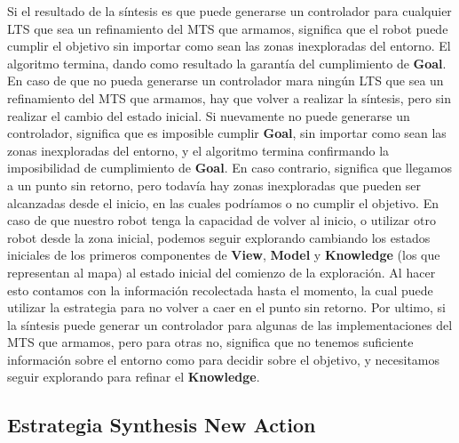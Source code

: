 \vspace{\baselineskip}
Si el resultado de la síntesis es que puede generarse un controlador para cualquier LTS que sea un refinamiento del MTS que armamos, significa que el robot
puede cumplir el objetivo sin importar como sean las zonas inexploradas del entorno. El algoritmo termina, dando como resultado la garantía del cumplimiento
de \textbf{Goal}.
En caso de que no pueda generarse un controlador mara ningún LTS que sea un refinamiento del MTS que armamos, hay que volver a realizar la síntesis, pero sin
realizar el cambio del estado inicial. Si nuevamente no puede generarse un controlador, significa que es imposible cumplir \textbf{Goal}, sin importar como sean
las zonas inexploradas del entorno, y el algoritmo termina confirmando la imposibilidad de cumplimiento de \textbf{Goal}. En caso contrario, significa que
llegamos a un punto sin retorno, pero todavía hay zonas inexploradas que pueden ser alcanzadas desde el inicio, en las cuales podríamos o no cumplir el objetivo.
En caso de que nuestro robot tenga la capacidad de volver al inicio, o utilizar otro robot desde la zona inicial, podemos seguir explorando cambiando los
estados iniciales de los primeros componentes de \textbf{View}, \textbf{Model} y \textbf{Knowledge} (los que representan al mapa) al estado inicial del comienzo
de la exploración. Al hacer esto contamos con la información recolectada hasta el momento, la cual puede utilizar la estrategia para no volver a caer en el
punto sin retorno.
Por ultimo, si la síntesis puede generar un controlador para algunas de las implementaciones del MTS que armamos, pero para otras no, significa que no tenemos
suficiente información sobre el entorno como para decidir sobre el objetivo, y necesitamos seguir explorando para refinar el \textbf{Knowledge}.

\subsection{Estrategia Synthesis New Action}

